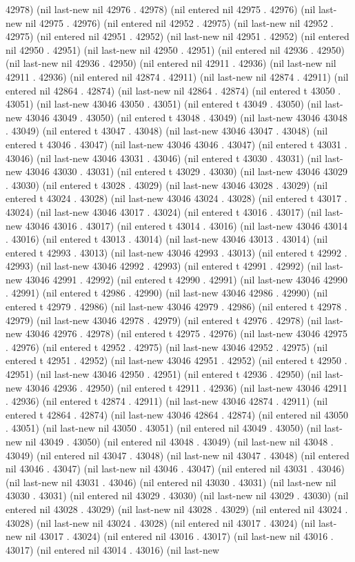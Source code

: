 42978) (nil last-new nil 42976 . 42978) (nil entered nil 42975 . 42976) (nil last-new nil 42975 . 42976) (nil entered nil 42952 . 42975) (nil last-new nil 42952 . 42975) (nil entered nil 42951 . 42952) (nil last-new nil 42951 . 42952) (nil entered nil 42950 . 42951) (nil last-new nil 42950 . 42951) (nil entered nil 42936 . 42950) (nil last-new nil 42936 . 42950) (nil entered nil 42911 . 42936) (nil last-new nil 42911 . 42936) (nil entered nil 42874 . 42911) (nil last-new nil 42874 . 42911) (nil entered nil 42864 . 42874) (nil last-new nil 42864 . 42874) (nil entered t 43050 . 43051) (nil last-new 43046 43050 . 43051) (nil entered t 43049 . 43050) (nil last-new 43046 43049 . 43050) (nil entered t 43048 . 43049) (nil last-new 43046 43048 . 43049) (nil entered t 43047 . 43048) (nil last-new 43046 43047 . 43048) (nil entered t 43046 . 43047) (nil last-new 43046 43046 . 43047) (nil entered t 43031 . 43046) (nil last-new 43046 43031 . 43046) (nil entered t 43030 . 43031) (nil last-new 43046 43030 . 43031) (nil entered t 43029 . 43030) (nil last-new 43046 43029 . 43030) (nil entered t 43028 . 43029) (nil last-new 43046 43028 . 43029) (nil entered t 43024 . 43028) (nil last-new 43046 43024 . 43028) (nil entered t 43017 . 43024) (nil last-new 43046 43017 . 43024) (nil entered t 43016 . 43017) (nil last-new 43046 43016 . 43017) (nil entered t 43014 . 43016) (nil last-new 43046 43014 . 43016) (nil entered t 43013 . 43014) (nil last-new 43046 43013 . 43014) (nil entered t 42993 . 43013) (nil last-new 43046 42993 . 43013) (nil entered t 42992 . 42993) (nil last-new 43046 42992 . 42993) (nil entered t 42991 . 42992) (nil last-new 43046 42991 . 42992) (nil entered t 42990 . 42991) (nil last-new 43046 42990 . 42991) (nil entered t 42986 . 42990) (nil last-new 43046 42986 . 42990) (nil entered t 42979 . 42986) (nil last-new 43046 42979 . 42986) (nil entered t 42978 . 42979) (nil last-new 43046 42978 . 42979) (nil entered t 42976 . 42978) (nil last-new 43046 42976 . 42978) (nil entered t 42975 . 42976) (nil last-new 43046 42975 . 42976) (nil entered t 42952 . 42975) (nil last-new 43046 42952 . 42975) (nil entered t 42951 . 42952) (nil last-new 43046 42951 . 42952) (nil entered t 42950 . 42951) (nil last-new 43046 42950 . 42951) (nil entered t 42936 . 42950) (nil last-new 43046 42936 . 42950) (nil entered t 42911 . 42936) (nil last-new 43046 42911 . 42936) (nil entered t 42874 . 42911) (nil last-new 43046 42874 . 42911) (nil entered t 42864 . 42874) (nil last-new 43046 42864 . 42874) (nil entered nil 43050 . 43051) (nil last-new nil 43050 . 43051) (nil entered nil 43049 . 43050) (nil last-new nil 43049 . 43050) (nil entered nil 43048 . 43049) (nil last-new nil 43048 . 43049) (nil entered nil 43047 . 43048) (nil last-new nil 43047 . 43048) (nil entered nil 43046 . 43047) (nil last-new nil 43046 . 43047) (nil entered nil 43031 . 43046) (nil last-new nil 43031 . 43046) (nil entered nil 43030 . 43031) (nil last-new nil 43030 . 43031) (nil entered nil 43029 . 43030) (nil last-new nil 43029 . 43030) (nil entered nil 43028 . 43029) (nil last-new nil 43028 . 43029) (nil entered nil 43024 . 43028) (nil last-new nil 43024 . 43028) (nil entered nil 43017 . 43024) (nil last-new nil 43017 . 43024) (nil entered nil 43016 . 43017) (nil last-new nil 43016 . 43017) (nil entered nil 43014 . 43016) (nil last-new 